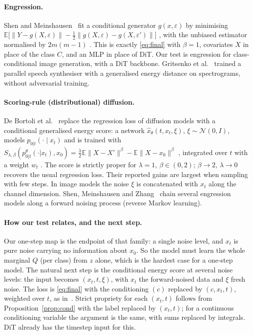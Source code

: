 \documentclass[11pt]{article}
\theoremstyle{definition}
\theoremstyle{remark}
\newcommand{\E}{\mathbb{E}}
\newcommand{\N}{\mathcal{N}}
\newcommand{\norm}[1]{\lVert #1\rVert}
\begin{document}
\paragraph{Engression.} Shen and Meinshausen~\cite{SM2025} fit a conditional generator $g(x,\varepsilon)$ by
minimising $\E\big[\norm{Y-g(X,\varepsilon)}-\tfrac12\norm{g(X,\varepsilon)-g(X,\varepsilon')}\big]$
\cite[eq.~(12)]{SM2025}, with the unbiased estimator normalised by $2m(m-1)$ \cite[eq.~(13)]{SM2025}. This is
exactly \eqref{eq:final} with $\beta=1$, covariates $X$ in place of the class $C$, and an MLP in place of
DiT. Our test is engression for class-conditional image generation, with a DiT backbone. Gritsenko et
al.~\cite{Gritsenko2020} trained a parallel speech synthesiser with a generalised energy distance on
spectrograms, without adversarial training.

\paragraph{Scoring-rule (distributional) diffusion.} De Bortoli et al.~\cite{DeBortoli2025} replace the
regression loss of diffusion models with a conditional generalised energy score: a network
$\hat x_\theta(t,x_t,\xi)$, $\xi\sim\N(0,I)$, models $p_{0|t}(\cdot\mid x_t)$ and is trained with
$S_{\lambda,\beta}(p^\theta_{0|t}(\cdot|x_t),x_0)=\tfrac\lambda2\E\norm{X-X'}^\beta-\E\norm{X-x_0}^\beta$
\cite[eq.~(12)]{DeBortoli2025}, integrated over $t$ with a weight $w_t$ \cite[eq.~(13)]{DeBortoli2025}.
The score is strictly proper for $\lambda=1$, $\beta\in(0,2)$; $\beta\to2$, $\lambda\to0$ recovers the
usual regression loss. Their reported gains are largest when sampling with few steps. In image models the
noise $\xi$ is concatenated with $x_t$ along the channel dimension. Shen, Meinshausen and
Zhang~\cite{Shen2025RML} chain several engression models along a forward noising process (reverse Markov
learning).

\paragraph{How our test relates, and the next step.} Our one-step map is the endpoint of that family: a
single noise level, and $x_t$ is pure noise carrying no information about $x_0$. So the model must learn the
whole marginal $Q$ (per class) from $z$ alone, which is the hardest case for a one-step model. The natural next
step is the conditional energy score at several noise levels: the input becomes $(x_t,t,\xi)$, with $x_t$
the forward-noised data and $\xi$ fresh noise. The loss is \eqref{eq:final} with the conditioning $(c)$
replaced by $(c,x_t,t)$, weighted over $t$, as in~\cite{DeBortoli2025}. Strict propriety for each
$(x_t,t)$ follows from Proposition~\ref{prop:cond} with the label replaced by $(x_t,t)$; for a continuous
conditioning variable the argument is the same, with sums replaced by integrals. DiT already has the
timestep input for this.
\end{document}
